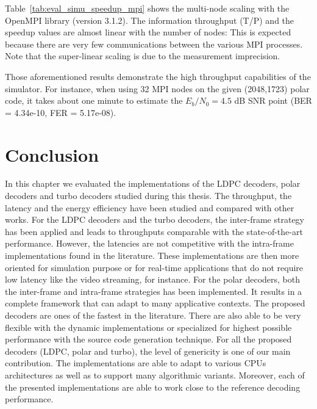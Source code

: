 Table~\ref{tab:eval_simu_speedup_mpi} shows the multi-node scaling with the
OpenMPI library (version 3.1.2). The information throughput (T/P) and the
speedup values are almost linear with the number of nodes: This is expected
because there are very few communications between the various MPI processes.
Note that the super-linear scaling is due to the measurement imprecision.

Those aforementioned results demonstrate the high throughput
capabilities of the \AFFECT simulator. For instance, when using 32 MPI nodes on
the given (2048,1723) polar code, it takes about one minute to estimate the
$E_b/N_0=4.5$ dB SNR point (BER = 4.34e-10, FER = 5.17e-08).

\section{Conclusion}

In this chapter we evaluated the implementations of the LDPC decoders, polar
decoders and turbo decoders studied during this thesis. The throughput, the
latency and the energy efficiency have been studied and compared with other
works. For the LDPC decoders and the turbo decoders, the inter-frame strategy
has been applied and leads to throughputs comparable with the state-of-the-art
performance. However, the latencies are not competitive with the intra-frame
implementations found in the literature. These implementations are then more
oriented for simulation purpose or for real-time applications that do not
require low latency like the video streaming, for instance. For the polar
decoders, both the inter-frame and intra-frame strategies has been implemented.
It results in a complete framework that can adapt to many applicative contexts.
The proposed decoders are ones of the fastest in the literature. There are also
able to be very flexible with the dynamic implementations or specialized for
highest possible performance with the source code generation technique. For all
the proposed decoders (LDPC, polar and turbo), the level of genericity is one of
our main contribution. The implementations are able to adapt to various CPUs
architectures as well as to support many algorithmic variants. Moreover, each of
the presented implementations are able to work close to the reference decoding
performance.

